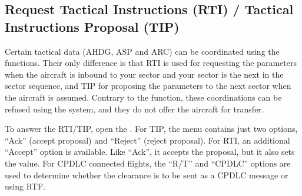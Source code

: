 \documentclass[a4paper,oneside,11pt]{memoir}
\begin{document}
\subsection{Request Tactical Instructions (RTI) / Tactical Instructions Proposal (TIP)}\label{win:rti}\label{win:tip}

Certain tactical data (AHDG, ASP and ARC) can be coordinated using the  functions. Their only difference is that RTI is used for requesting the parameters when the aircraft is inbound to your sector and your sector is the next in the sector sequence, and TIP for proposing the parameters to the next sector when the aircraft is assumed. Contrary to the  function, these coordinations can be refused using the system, and they do not offer the aircraft for transfer.


To answer the RTI/TIP, open the . For TIP, the menu contains just two options, “Ack” (accept proposal) and “Reject” (reject proposal). For RTI, an additional “Accept” option is available. Like “Ack”, it accepts the proposal, but it also sets the value. For CPDLC connected flights, the “R/T” and “CPDLC” options are used to determine whether the clearance is to be sent as a CPDLC message or using RTF.


\end{document}
